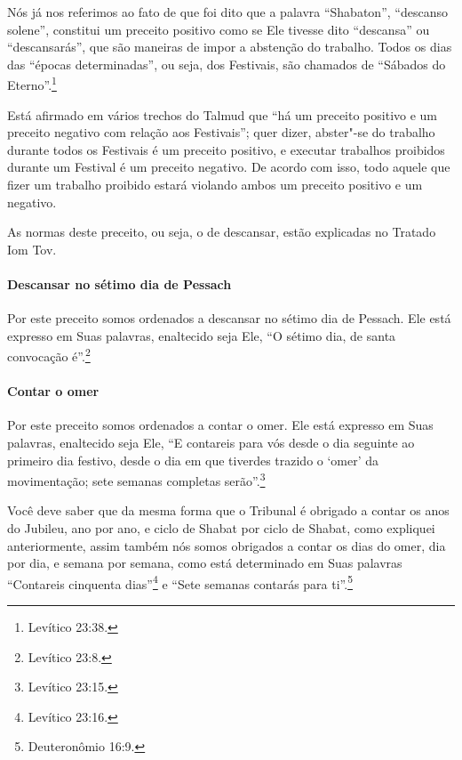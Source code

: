 \begin{multicols}{2}
Nós já nos referimos ao fato de que foi dito que a palavra
``Shabaton'', ``descanso solene'', constitui um preceito positivo como
se Ele tivesse dito ``descansa'' ou ``descansarás'', que são maneiras de
impor a abstenção do trabalho. Todos os dias das ``épocas
determinadas'', ou seja, dos Festivais, são chamados de ``Sábados do
Eterno''.\footnote{Levítico 23:38.}

Está afirmado em vários trechos do Talmud\starr{} que ``há um preceito positivo
e um preceito negativo com relação aos Festivais''; quer dizer,
abster"-se do trabalho durante todos os Festivais é um preceito positivo,
e executar trabalhos proibidos durante um Festival é um preceito
negativo. De acordo com isso, todo aquele que fizer um trabalho
proibido estará violando ambos um preceito positivo e um negativo.

As normas deste preceito, ou seja, o de descansar, estão explicadas no
Tratado Iom Tov\starr.

\paragraph{Descansar no sétimo dia de Pessach\starr{}}

Por este preceito somos ordenados a descansar no sétimo dia de
Pessach\starr. Ele está expresso em Suas palavras, enaltecido seja Ele,
``O sétimo dia, de santa convocação é''.\footnote{Levítico 23:8.}

\paragraph{Contar o omer\starr}

Por este preceito somos ordenados a contar o omer\starr. Ele está
expresso em Suas palavras, enaltecido seja Ele, ``E contareis para vós
desde o dia seguinte ao primeiro dia festivo, desde o dia em que
tiverdes trazido o `omer' da movimentação; sete semanas completas
serão''.\footnote{Levítico 23:15.}

Você deve saber que da mesma forma que o Tribunal é obrigado a contar os
anos do Jubileu, ano por ano, e ciclo de Shabat por ciclo de Shabat,
como expliquei anteriormente, assim também nós somos obrigados a contar
os dias do omer\starr, dia por dia, e semana por semana, como está
determinado em Suas palavras ``Contareis cinquenta dias''\footnote{Levítico
23:16.} e ``Sete semanas contarás para ti''.\footnote{Deuteronômio 16:9.}


\end{multicols}
